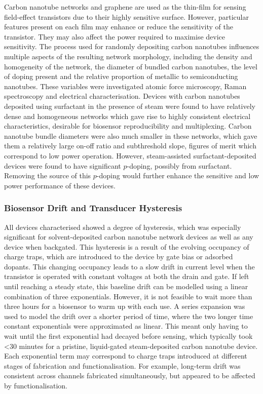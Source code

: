 \documentclass[
  letterpaper,
  DIV=11,
  numbers=noendperiod]{scrartcl}
\begin{document}
Carbon nanotube networks and graphene are used as the thin-film for
sensing field-effect transistors due to their highly sensitive surface.
However, particular features present on each film may enhance or reduce
the sensitivity of the transistor. They may also affect the power
required to maximise device sensitivity. The process used for randomly
depositing carbon nanotubes influences multiple aspects of the resulting
network morphology, including the density and homogeneity of the
network, the diameter of bundled carbon nanotubes, the level of doping
present and the relative proportion of metallic to semiconducting
nanotubes. These variables were investigated atomic force microscopy,
Raman spectroscopy and electrical characterisation. Devices with carbon
nanotubes deposited using surfactant in the presence of steam were found
to have relatively dense and homogeneous networks which gave rise to
highly consistent electrical characteristics, desirable for biosensor
reproducibility and multiplexing. Carbon nanotube bundle diameters were
also much smaller in these networks, which gave them a relatively large
on-off ratio and subthreshold slope, figures of merit which correspond
to low power operation. However, steam-assisted surfactant-deposited
devices were found to have significant \(p\)-doping, possibly from
surfactant. Removing the source of this \(p\)-doping would further
enhance the sensitive and low power performance of these devices.

\hypertarget{biosensor-drift-and-transducer-hysteresis}{%
\subsubsection{Biosensor Drift and Transducer
Hysteresis}\label{biosensor-drift-and-transducer-hysteresis}}

All devices characterised showed a degree of hysteresis, which was
especially significant for solvent-deposited carbon nanotube network
devices as well as any device when backgated. This hysteresis is a
result of the evolving occupancy of charge traps, which are introduced
to the device by gate bias or adsorbed dopants. This changing occupancy
leads to a slow drift in current level when the transistor is operated
with constant voltages at both the drain and gate. If left until
reaching a steady state, this baseline drift can be modelled using a
linear combination of three exponentials. However, it is not feasible to
wait more than three hours for a biosensor to warm up with each use. A
series expansion was used to model the drift over a shorter period of
time, where the two longer time constant exponentials were approximated
as linear. This meant only having to wait until the first exponential
had decayed before sensing, which typically took \textless30 minutes for
a pristine, liquid-gated steam-deposited carbon nanotube device. Each
exponential term may correspond to charge traps introduced at different
stages of fabrication and functionalisation. For example, long-term
drift was consistent across channels fabricated simultaneously, but
appeared to be affected by functionalisation.
\end{document}
